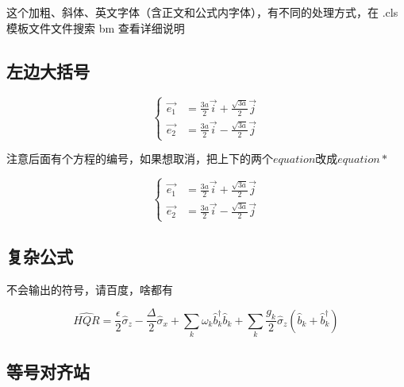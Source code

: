 \documentclass[AutoFakeBold]{LZUThesis}
\begin{document}
这个加粗、斜体、英文字体（含正文和公式内字体），有不同的处理方式，在 .cls 模板文件文件搜索 bm 查看详细说明



\subsection{左边大括号} %
\label{sub:左边大括号}

\begin{equation}
    \left\{
    \begin{array}{rcl}
        \vec{e_1} &= \frac{3a}{2} \vec{i} + \frac{\sqrt{3a}}{2} \vec{j} \\
        \vec{e_2} &= \frac{3a}{2} \vec{i} - \frac{\sqrt{3a}}{2} \vec{j}
    \end{array}
    \right.
    \label{e1e2}
\end{equation}

注意后面有个方程的编号，如果想取消，把上下的两个$equation$改成$equation*$

\begin{equation*}
    \left\{
    \begin{array}{rcl}
        \vec{e_1} &= \frac{3a}{2} \vec{i} + \frac{\sqrt{3a}}{2} \vec{j} \\
        \vec{e_2} &= \frac{3a}{2} \vec{i} - \frac{\sqrt{3a}}{2} \vec{j}
    \end{array}
    \right.
    \label{e1e2_2}
\end{equation*}


\subsection{复杂公式} %
\label{sub:复杂公式}
不会输出的符号，请百度，啥都有

\begin{equation}
\hat{HQR}=\frac{\epsilon}{2}\hat{\sigma}_{z}-\frac{\Delta}{2}\hat{\sigma}_{x}+\sum_{k}\omega_{k}\hat{b}_{k}^{\dagger}\hat{b}_{k}+\sum_{k}\frac{g_{k}}{2}\hat{\sigma}_{z}(\hat{b}_{k}+\hat{b}_{k}^{\dagger})\label{eq:sbm}
\end{equation}



\subsection{等号对齐站} %
\label{sub:等号对齐站}
\end{document}
